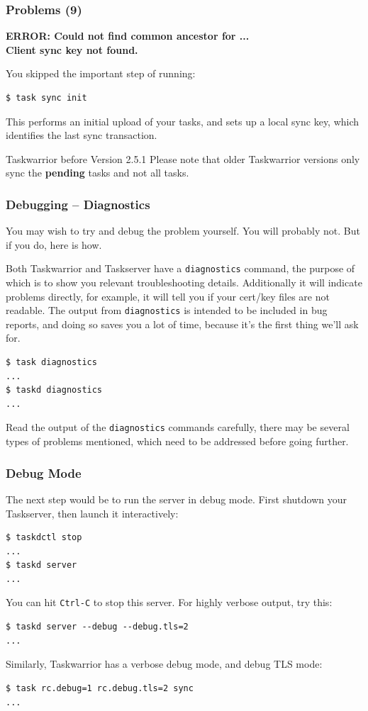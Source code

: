 \documentclass[t,handout]{beamer}
\begin{document}
\begin{frame}[fragile]\frametitle{Problems (9)}
    \textbf{ERROR: Could not find common ancestor for ...\\
Client sync key not found.}

    You skipped the important step of running:
    \begin{lstlisting}
$ task sync init\end{lstlisting}

    This performs an initial upload of your tasks, and sets up a local sync key, which identifies the last sync transaction.

    \begin{alertblock}{Taskwarrior before Version 2.5.1}
        Please note that older Taskwarrior versions only sync the \textbf{pending} tasks and not all tasks.
    \end{alertblock}
\end{frame}

\begin{frame}[fragile]\frametitle{Debugging -- Diagnostics}
      You may wish to try and debug the problem yourself. You will probably not. But if you do, here is how.

      Both Taskwarrior and Taskserver have a \verb+diagnostics+ command, the purpose of which is to show you relevant troubleshooting details. Additionally it will indicate problems directly, for example, it will tell you if your cert/key files are not readable. The output from \verb+diagnostics+ is intended to be included in bug reports, and doing so saves you a lot of time, because it's the first thing we'll ask for.

      \begin{lstlisting}
$ task diagnostics
...
$ taskd diagnostics
...\end{lstlisting}

    Read the output of the \verb+diagnostics+ commands carefully, there may be several types of problems mentioned, which need to be addressed before going further.
\end{frame}

\begin{frame}[fragile]\frametitle{Debug Mode}
    The next step would be to run the server in debug mode. First shutdown your Taskserver, then launch it interactively:

    \begin{lstlisting}
$ taskdctl stop
...
$ taskd server
...\end{lstlisting}

    You can hit \verb+Ctrl-C+ to stop this server. For highly verbose output, try this:
    \begin{lstlisting}
$ taskd server --debug --debug.tls=2
...\end{lstlisting}

    Similarly, Taskwarrior has a verbose debug mode, and debug TLS mode:
    \begin{lstlisting}
$ task rc.debug=1 rc.debug.tls=2 sync
...\end{lstlisting}
\end{frame}
\end{document}
